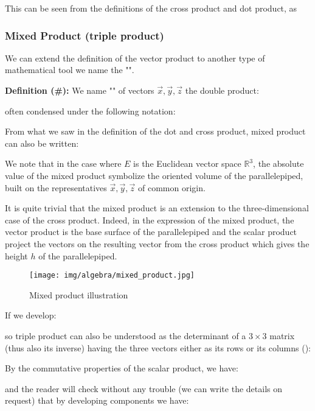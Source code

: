 	This can be seen from the definitions of the cross product and dot product, as
	
	
	\pagebreak
	\subsubsection{Mixed Product (triple product)}
	We can extend the definition of the vector product to another type of mathematical tool we name the "".
	
	\textbf{Definition (\#\mydef):} We name "\label{mixed product}" of vectors $\vec{x},\vec{y},\vec{z}$ the double product:
	 
	 often condensed under the following notation:
	  
	 From what we saw in the definition of the dot and cross product, mixed product can also be written:
	 
	 We note that in the case where $E$ is the Euclidean vector space $\mathbb{R}^3$, the absolute value of the mixed product symbolize the oriented volume of the parallelepiped, built on the representatives $\vec{x},\vec{y},\vec{z}$ of common origin.
	 
	It is quite trivial that the mixed product is an extension to the three-dimensional case of the cross product. Indeed, in the expression of the mixed product, the vector product is the base surface of the parallelepiped and the scalar product project the vectors on the resulting vector from the cross product which gives the height $h$ of the parallelepiped.
	
	\begin{figure}[H]
		\centering
		\texttt{[image: img/algebra/mixed\_product.jpg]}
		\caption{Mixed product illustration}		
	\end{figure}
			
	If we develop:
	
	so triple product can also be understood as the determinant of a $3\times 3$ matrix (thus also its inverse) having the three vectors either as its rows or its columns ():
	
	 By the commutative properties of the scalar product, we have:
	 
	and the reader will check without any trouble (we can write the details on request) that by developing components we have:
	

